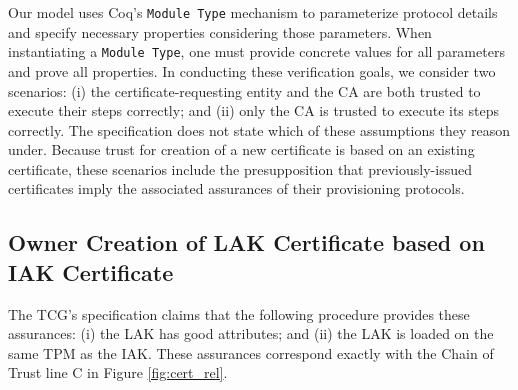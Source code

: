 \documentclass[runningheads]{llncs}
\begin{document}
Our model uses Coq's \verb|Module Type| mechanism to parameterize
protocol details and specify necessary properties considering those
parameters.  When instantiating a \verb|Module Type|, one must provide
concrete values for all parameters and prove all properties.  In
conducting these verification goals, we consider two scenarios: (i)
the certificate-requesting entity and the CA are both trusted to
execute their steps correctly; and (ii) only the CA is trusted to
execute its steps correctly. The specification does not state which of
these assumptions they reason under.  Because trust for creation of a
new certificate is based on an existing certificate, these scenarios
include the presupposition that previously-issued certificates imply
the associated assurances of their provisioning protocols.

\subsection{Owner Creation of LAK Certificate based on IAK Certificate}

The TCG's specification claims that the following procedure provides
these assurances: (i) the LAK has good attributes; and (ii) the LAK is
loaded on the same TPM as the IAK. These assurances correspond exactly
with the Chain of Trust line C in Figure \ref{fig:cert_rel}.
\end{document}
